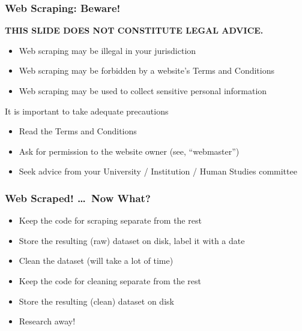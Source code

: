 \documentclass[10pt, aspectratio=1610, natbib, handout]{beamer}
\begin{document}
  \begin{frame}
    \frametitle{Web Scraping: Beware!}

    \begin{center}
      \textbf{THIS SLIDE DOES NOT CONSTITUTE LEGAL ADVICE.}
    \end{center}

    \vfill\pause

    \begin{itemize}
      \item Web scraping may be illegal in your jurisdiction
      \item Web scraping may be forbidden by a website's Terms and Conditions
      \item Web scraping may be used to collect sensitive personal information
    \end{itemize}

    \vfill\pause

    It is important to take adequate precautions
    \begin{itemize}
      \item Read the Terms and Conditions
      \item Ask for permission to the website owner (see, ``webmaster'')
      \item Seek advice from your University / Institution / Human Studies committee
    \end{itemize}

  \end{frame}

  \begin{frame}
    \frametitle{Web Scraped! \dots\ Now What?}

    \begin{itemize}
      \item Keep the code for scraping separate from the rest
      \vfill\pause
      \item Store the resulting (raw) dataset on disk, label it with a date
      \vfill\pause
      \item Clean the dataset (will take a lot of time)
      \vfill\pause
      \item Keep the code for cleaning separate from the rest
      \vfill\pause
      \item Store the resulting (clean) dataset on disk
      \vfill\pause
      \item Research away!
    \end{itemize}

  \end{frame}
\end{document}
